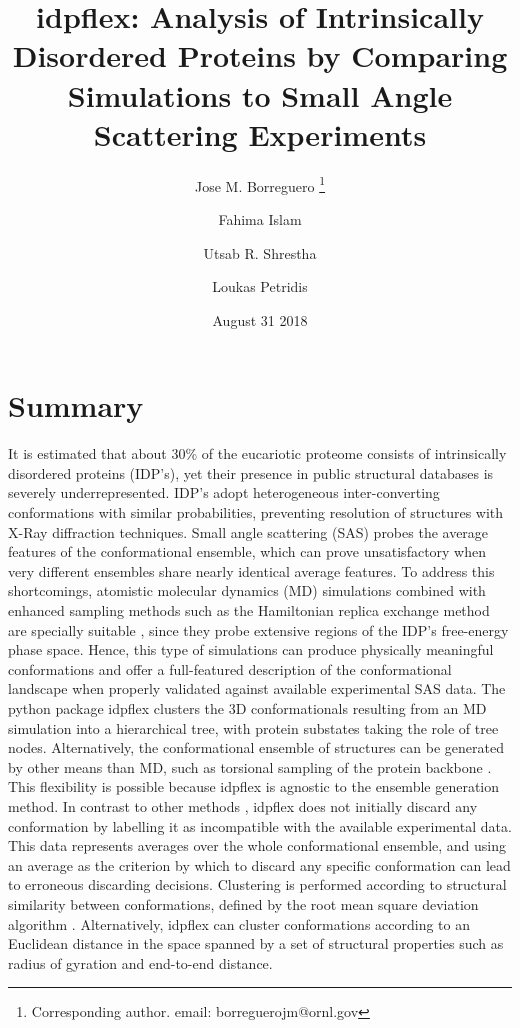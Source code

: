 \documentclass[12pt]{article}
\title{idpflex: Analysis of Intrinsically Disordered Proteins by Comparing Simulations to Small Angle Scattering Experiments}
\author[1]{Jose M. Borreguero \thanks{Corresponding author. email: borreguerojm@ornl.gov}}
\author[1]{Fahima Islam}
\author[2]{Utsab R. Shrestha}
\author[2]{Loukas Petridis}
\affil[1]{Neutron Scattering Division, Oak Ridge National Laboratory, Oak Ridge TN, USA}
\affil[2]{Biosciences Division, Oak Ridge National Laboratory, Oak Ridge TN, USA}
\date{August 31 2018}
\begin{document}
\maketitle

\section{Summary}\label{summary}

It is estimated that about 30\% of the eucariotic proteome consists of intrinsically disordered proteins (IDP’s), yet their presence in public structural databases is severely underrepresented.
IDP’s adopt heterogeneous inter-converting conformations with similar probabilities, preventing resolution of structures with X-Ray diffraction techniques.
Small angle scattering (SAS) probes the average features of the conformational ensemble, which can
prove unsatisfactory when very different ensembles share nearly identical average features.
To address this shortcomings, atomistic molecular dynamics (MD) simulations combined with enhanced sampling methods such as the
Hamiltonian replica exchange method are specially suitable \cite{Affentranger06}, since they probe extensive regions of the IDP's free-energy phase space.
Hence, this type of simulations can produce physically meaningful conformations and offer a full-featured description of the conformational landscape when properly validated against available experimental SAS data.
The python package idpflex clusters the 3D conformationals resulting from an MD simulation into a
hierarchical tree, with protein substates taking the role of tree nodes.
Alternatively, the conformational ensemble of structures can be generated by other means than MD, such as torsional sampling of the protein backbone \cite{Curtis12}.
This flexibility is possible because idpflex is agnostic to the ensemble generation method.
In contrast to other methods \cite{Rozycki11}, idpflex does not initially discard any conformation by labelling it as incompatible with the available experimental data.
This data represents averages over the whole conformational ensemble, and using an average as the criterion by which to discard any specific conformation can lead to erroneous discarding decisions.
Clustering is performed according to structural similarity between conformations, defined by the root mean square deviation algorithm \cite{Kabsch76}.
Alternatively, idpflex can cluster conformations according to an Euclidean distance in the space spanned by a set of structural properties such as radius of gyration and end-to-end distance.
\end{document}
